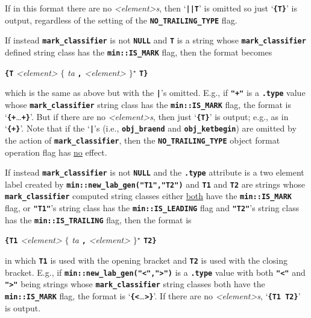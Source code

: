 \documentclass[12pt]{article}
\newcommand{\TT}[1]{{\tt \bfseries #1}}
\newcommand{\STAR}{{\Large $^\star$}}
\newcommand{\OPEN}{{$\{$}}
\newcommand{\CLOSE}{{$\}$}}
\newcommand{\EOL}{\penalty \exhyphenpenalty}
\begin{document}
If in this format there are no {\em <element>s}, then `\TT{||T}' is
omitted so just `\TT{\{T\}}' is output, regardless of the setting
of the \TT{NO\_\EOL TRAILING\_\EOL TYPE} flag.

If instead \TT{mark\_\EOL classifier}\label{MARK_CLASSIFIER_USAGE} is not
\TT{NULL} and \TT{T} is a string
whose \TT{mark\_\EOL classifier} defined
string class has the \TT{min::\EOL IS\_\EOL MARK} flag, then the format becomes
\begin{center}
\TT{\{}\TT{T} {\em <element>}
    \OPEN{} {\em ta} \TT{,} \TT{\textvisiblespace} {\em <element>} \CLOSE\STAR{}
    \TT{T}\TT{\}}
\end{center}
which is the same as above but with the \TT{|}'s omitted.
E.g., if \TT{"+"} is a \TT{.type} value whose \TT{mark\_\EOL classifier} string
class has the \TT{min::\EOL IS\_\EOL MARK} flag,
the format is `\TT{\{+}\ldots\TT{+\}}'.
But if there are no {\em <element>s}, then just `\TT{\{T\}}' is output;
e.g., as in `\TT{\{+\}}'.
Note that if the `\TT{|}'s (i.e., \TT{obj\_\EOL braend} and
\TT{obj\_\EOL ketbegin}) are omitted by the action of
\TT{mark\_\EOL classifier}, then the \TT{NO\_\EOL TRAILING\_\EOL TYPE}
object format operation flag has \underline{no} effect.

If instead \TT{mark\_\EOL classifier} is not
\TT{NULL} and the \TT{.type} attribute is a two element label created by
\TT{min::new\_\EOL lab\_\EOL gen("T1","T2")} and
\TT{T1} and \TT{T2} are strings whose \TT{mark\_\EOL classifier} computed
string classes either
\underline{both} have the \TT{min::\EOL IS\_\EOL MARK} flag, or
\TT{"T1"}'s string class has the \TT{min::\EOL IS\_\EOL LEADING} flag and
\TT{"T2"}'s string class has the \TT{min::\EOL IS\_\EOL TRAILING} flag,
then the format is
\begin{center}
\TT{\{}\TT{T1} {\em <element>}
    \OPEN{} {\em ta} \TT{,} \TT{\textvisiblespace} {\em <element>} \CLOSE\STAR{}
    \TT{T2}\TT{\}}
\end{center}
in which \TT{T1} is used with the opening bracket and \TT{T2} is used
with the closing bracket.
E.g., if \TT{min::\EOL new\_\EOL lab\_\EOL gen("<",">")} is a \TT{.type}
value with both \TT{"<"} and \TT{">"} being strings whose
\TT{mark\_\EOL classifier} string classes both have the
\TT{min::\EOL IS\_\EOL MARK} flag, the format is `\TT{\{<}\ldots\TT{>\}}'.
If there are no {\em <element>s}, `\TT{\{T1 T2\}}' is output.
\end{document}
